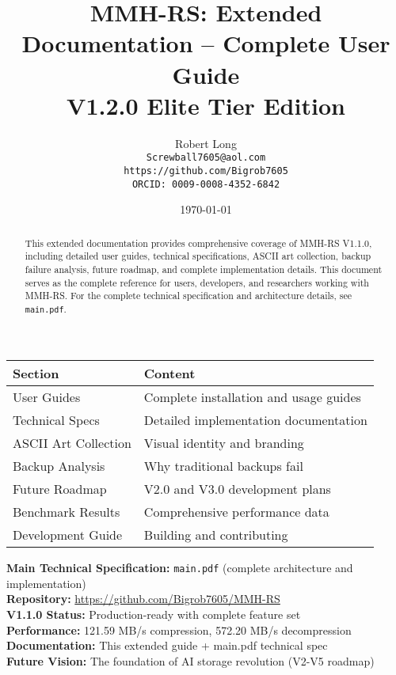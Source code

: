 \documentclass[11pt,a4paper]{article}
\title{MMH-RS: Extended Documentation -- Complete User Guide\\[1ex]\textbf{\large V1.2.0 Elite Tier Edition}}
\author{Robert Long \\ \texttt{Screwball7605@aol.com} \\ \texttt{https://github.com/Bigrob7605} \\ \texttt{ORCID: 0009-0008-4352-6842}}
\date{\today}
\begin{document}
	\maketitle
	\thispagestyle{empty}
	\begin{abstract}
		This extended documentation provides comprehensive coverage of MMH-RS V1.1.0, including detailed user guides, technical specifications, ASCII art collection, backup failure analysis, future roadmap, and complete implementation details. This document serves as the complete reference for users, developers, and researchers working with MMH-RS. For the complete technical specification and architecture details, see \texttt{main.pdf}.
	\end{abstract}

	\begin{center}
	\begin{tcolorbox}[colback=gray!5, colframe=gray!60, boxrule=0.7pt, arc=2pt, title=\textbf{\large MMH-RS Extended Documentation Contents}]
	\begin{tabular}{@{}ll@{}}
	\toprule
	\textbf{Section} & \textbf{Content} \\
	\midrule
	User Guides & Complete installation and usage guides \\
	Technical Specs & Detailed implementation documentation \\
	ASCII Art Collection & Visual identity and branding \\
	Backup Analysis & Why traditional backups fail \\
	Future Roadmap & V2.0 and V3.0 development plans \\
	Benchmark Results & Comprehensive performance data \\
	Development Guide & Building and contributing \\
	\bottomrule
	\end{tabular}
	\end{tcolorbox}
	\end{center}

	\begin{calloutbox}
	\textbf{Main Technical Specification:} \texttt{main.pdf} (complete architecture and implementation) \\
	\textbf{Repository:} \url{https://github.com/Bigrob7605/MMH-RS} \\
	\textbf{V1.1.0 Status:} Production-ready with complete feature set \\
	\textbf{Performance:} 121.59 MB/s compression, 572.20 MB/s decompression \\
	\textbf{Documentation:} This extended guide + main.pdf technical spec \\
	\textbf{Future Vision:} The foundation of AI storage revolution (V2-V5 roadmap)
	\end{calloutbox}
	
\end{document}
